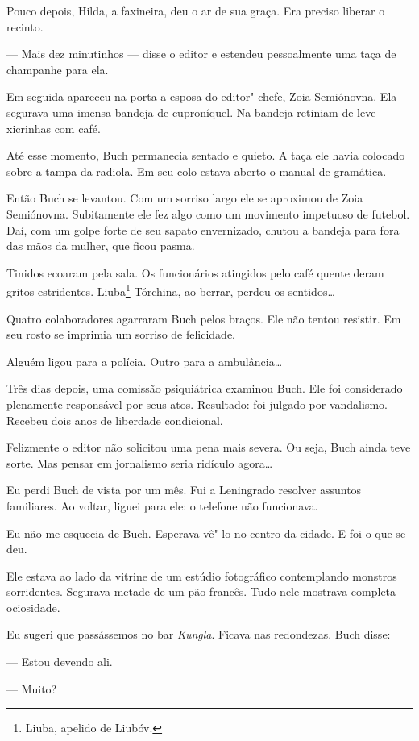 Pouco depois, Hilda, a faxineira, deu o ar de sua graça. Era preciso
liberar o recinto.

--- Mais dez minutinhos --- disse o editor e estendeu pessoalmente uma
taça de champanhe para ela.

Em seguida apareceu na porta a esposa do editor"-chefe, Zoia Semiónovna.
Ela segurava uma imensa bandeja de cuproníquel. Na bandeja retiniam de
leve xicrinhas com café.

Até esse momento, Buch permanecia sentado e quieto. A taça ele havia colocado
sobre a tampa da radiola. Em seu colo estava aberto o manual de
gramática.

Então Buch se levantou. Com um sorriso largo ele se aproximou de Zoia
Semiónovna. Subitamente ele fez algo como um movimento impetuoso de
futebol. Daí, com um golpe forte de seu sapato envernizado, chutou a
bandeja para fora das mãos da mulher, que ficou pasma.

Tinidos ecoaram pela sala. Os funcionários atingidos pelo café quente
deram gritos estridentes. Liuba\footnote{Liuba, apelido de Liubóv.} Tórchina, ao berrar, perdeu os
sentidos\ldots{}

Quatro colaboradores agarraram Buch pelos braços. Ele não tentou
resistir. Em seu rosto se imprimia um sorriso de felicidade.

Alguém ligou para a polícia. Outro para a ambulância\ldots{}

Três dias depois, uma comissão psiquiátrica examinou Buch. Ele foi
considerado plenamente responsável por seus atos. Resultado: foi julgado
por vandalismo. Recebeu dois anos de liberdade condicional.

Felizmente o editor não solicitou uma pena mais severa. Ou seja, Buch
ainda teve sorte. Mas pensar em jornalismo seria ridículo agora\ldots{}

Eu perdi Buch de vista por um mês. Fui a Leningrado resolver assuntos
familiares. Ao voltar, liguei para ele: o telefone não funcionava.

Eu não me esquecia de Buch. Esperava vê"-lo no centro da cidade. E foi o
que se deu.

Ele estava ao lado da vitrine de um estúdio fotográfico contemplando
monstros sorridentes. Segurava metade de um pão francês. Tudo nele
mostrava completa ociosidade.

Eu sugeri que passássemos no bar \emph{Kungla}. Ficava nas redondezas.
Buch disse:

--- Estou devendo ali.

--- Muito?

